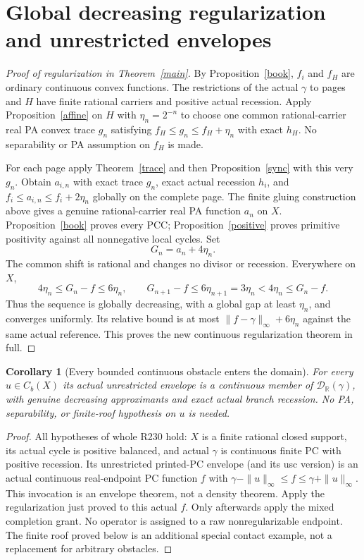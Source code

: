 \documentclass[11pt]{article}
\newtheorem{corollary}[theorem]{Corollary}
\theoremstyle{definition}\newtheorem{definition}[theorem]{Definition}
\theoremstyle{remark}\newtheorem{remark}[theorem]{Remark}
\newcommand{\R}{\mathbb R}\newcommand{\Q}{\mathbb Q}
\newcommand{\D}{\mathcal D_{\R}(\gamma)}
\begin{document}
\section{Global decreasing regularization and unrestricted envelopes}
\begin{proof}[Proof of regularization in Theorem~\ref{main}]
By Proposition~\ref{book}, $f_i$ and $f_H$ are ordinary continuous convex functions. The restrictions of the actual $\gamma$ to pages and $H$ have finite rational carriers and positive actual recession. Apply Proposition~\ref{affine} on $H$ with $\eta_n=2^{-n}$ to choose one common rational-carrier real PA convex trace $g_n$ satisfying
$f_H\leq g_n\leq f_H+\eta_n$ with exact $h_H$. No separability or PA assumption on $f_H$ is made.

For each page apply Theorem~\ref{trace} and then Proposition~\ref{sync} with this very $g_n$. Obtain $a_{i,n}$ with exact trace $g_n$, exact actual recession $h_i$, and
$f_i\leq a_{i,n}\leq f_i+2\eta_n$ globally on the complete page. The finite gluing construction above gives a genuine rational-carrier real PA function $a_n$ on $X$. Proposition~\ref{book} proves every PCC; Proposition~\ref{positive} proves primitive positivity against all nonnegative local cycles. Set
\begin{equation}\label{decrease}
G_n=a_n+4\eta_n.
\end{equation}
The common shift is rational and changes no divisor or recession. Everywhere on $X$,
\[
4\eta_n\leq G_n-f\leq6\eta_n,\qquad
G_{n+1}-f\leq6\eta_{n+1}=3\eta_n<4\eta_n\leq G_n-f.
\]
Thus the sequence is globally decreasing, with a global gap at least $\eta_n$, and converges uniformly. Its relative bound is at most $\|f-\gamma\|_\infty+6\eta_n$ against the same actual reference. This proves the new continuous regularization theorem in full.
\end{proof}

\begin{corollary}[Every bounded continuous obstacle enters the domain]\label{envelope}
For every $u\in C_b(X)$ its actual unrestricted envelope is a continuous member of $\D$, with genuine decreasing approximants and exact actual branch recession. No PA, separability, or finite-roof hypothesis on $u$ is needed.
\end{corollary}
\begin{proof}
All hypotheses of whole R230 hold: $X$ is a finite rational closed support, its actual cycle is positive balanced, and actual $\gamma$ is continuous finite PC with positive recession. Its unrestricted printed-PC envelope (and its usc version) is an actual continuous real-endpoint PC function $f$ with
$\gamma-\|u\|_\infty\leq f\leq\gamma+\|u\|_\infty$.
This invocation is an envelope theorem, not a density theorem. Apply the regularization just proved to this actual $f$. Only afterwards apply the mixed completion grant. No operator is assigned to a raw nonregularizable endpoint. The finite roof proved below is an additional special contact example, not a replacement for arbitrary obstacles.
\end{proof}
\end{document}
